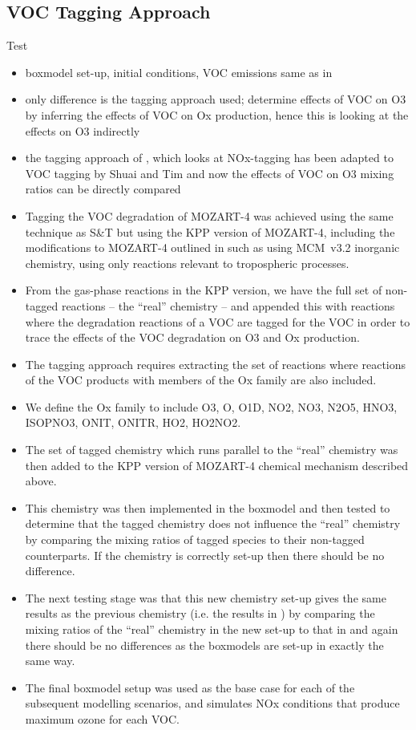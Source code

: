 \subsection{VOC Tagging Approach} \label{ss:O3_tagging}
Test
\begin{itemize}
    \item boxmodel set-up, initial conditions, VOC emissions same as in \citet{Coates:2015}
    \item only difference is the tagging approach used; \citet{Coates:2015} determine effects of VOC on O3 by inferring the effects of VOC on Ox production, hence this is looking at the effects on O3 indirectly
    \item the tagging approach of \citet{Emmons:2012}, which looks at NOx-tagging has been adapted to VOC tagging by Shuai and Tim and now the effects of VOC on O3 mixing ratios can be directly compared
    \item Tagging the VOC degradation of MOZART-4 was achieved using the same technique as S\&T but using the KPP version of MOZART-4, including the modifications to MOZART-4 outlined in \citet{Coates:2015} such as using MCM~v3.2 inorganic chemistry, using only reactions relevant to tropospheric processes.
    \item From the gas-phase reactions in the KPP version, we have the full set of non-tagged reactions -- the ``real'' chemistry -- and appended this with reactions where the degradation reactions of a VOC are tagged for the VOC in order to trace the effects of the VOC degradation on O3 and Ox production.
    \item The tagging approach requires extracting the set of reactions where reactions of the VOC products with members of the Ox family are also included.
    \item We define the Ox family to include O3, O, O1D, NO2, NO3, N2O5, HNO3, ISOPNO3, ONIT, ONITR, HO2, HO2NO2.
    \item The set of tagged chemistry which runs parallel to the ``real'' chemistry was then added to the KPP version of MOZART-4 chemical mechanism described above.
    \item This chemistry was then implemented in the boxmodel and then tested to determine that the tagged chemistry does not influence the ``real'' chemistry by comparing the mixing ratios of tagged species to their non-tagged counterparts. If the chemistry is correctly set-up then there should be no difference.
    \item The next testing stage was that this new chemistry set-up gives the same results as the previous chemistry (i.e. the results in \citet{Coates:2015}) by comparing the mixing ratios of the ``real'' chemistry in the new set-up to that in \citet{Coates:2015} and again there should be no differences as the boxmodels are set-up in exactly the same way.
    \item The final boxmodel setup was used as the base case for each of the subsequent modelling scenarios, and simulates NOx conditions that produce maximum ozone for each VOC.
\end{itemize}

